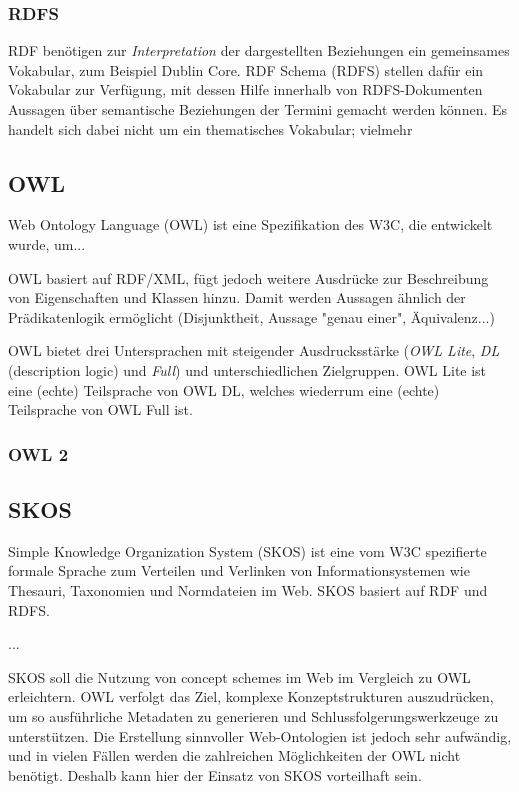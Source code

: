 	\subsubsection{RDFS}
	RDF benötigen zur \emph{Interpretation} der dargestellten Beziehungen ein gemeinsames Vokabular, zum Beispiel Dublin Core. RDF Schema (RDFS) stellen dafür ein Vokabular zur Verfügung, mit dessen Hilfe innerhalb von RDFS-Dokumenten Aussagen über semantische Beziehungen der Termini gemacht werden können. Es handelt sich dabei nicht um ein thematisches Vokabular; vielmehr 

	\subsection{OWL}
	Web Ontology Language (OWL) ist eine Spezifikation des W3C, die entwickelt wurde, um...
	
	OWL basiert auf RDF/XML, fügt jedoch weitere Ausdrücke zur Beschreibung von Eigenschaften und Klassen hinzu. Damit werden Aussagen ähnlich der Prädikatenlogik ermöglicht (Disjunktheit, Aussage "genau einer", Äquivalenz...)
	
	OWL bietet drei Untersprachen mit steigender Ausdrucksstärke (\emph{OWL Lite}, \emph{DL} (description logic) und \emph{Full}) und unterschiedlichen Zielgruppen. OWL Lite ist eine (echte) Teilsprache von OWL DL, welches wiederrum eine (echte) Teilsprache von OWL Full ist.
	
	
	\subsubsection{OWL 2}
	
	\subsection{SKOS}
	Simple Knowledge Organization System (SKOS) ist eine vom W3C spezifierte formale Sprache zum Verteilen und Verlinken von Informationsystemen wie Thesauri, Taxonomien und Normdateien im Web. SKOS basiert auf RDF und RDFS.
	
	...
	
	SKOS soll die Nutzung von concept schemes im Web im Vergleich zu OWL erleichtern. OWL verfolgt das Ziel, komplexe Konzeptstrukturen auszudrücken, um so ausführliche Metadaten zu generieren und Schlussfolgerungswerkzeuge zu unterstützen. Die Erstellung sinnvoller Web-Ontologien ist jedoch sehr aufwändig, und in vielen Fällen werden die zahlreichen Möglichkeiten der OWL nicht benötigt. Deshalb kann hier der Einsatz von SKOS vorteilhaft sein.
	
	
	
	

